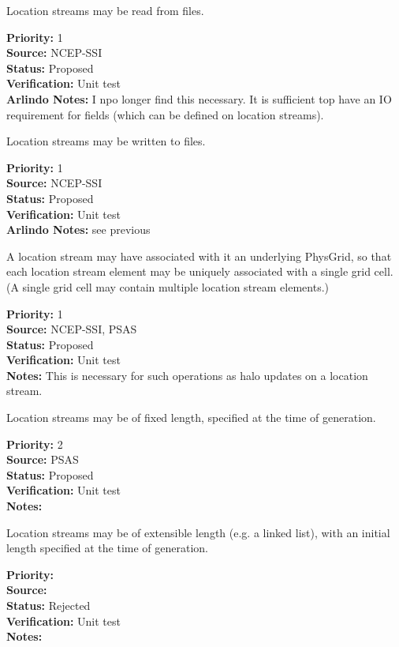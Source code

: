 Location streams may be read from files.
\begin{reqlist}
{\bf Priority:} 1 \\
{\bf Source:} NCEP-SSI \\
{\bf Status:} Proposed \\
{\bf Verification:} Unit test \\
{\bf Arlindo Notes:} I npo longer find this necessary. It is sufficient top have an IO requirement for fields (which can be defined on location streams).
\end{reqlist}

Location streams may be written to files.
\begin{reqlist}
{\bf Priority:} 1 \\
{\bf Source:} NCEP-SSI \\
{\bf Status:} Proposed \\
{\bf Verification:} Unit test \\
{\bf Arlindo Notes:} see previous 
\end{reqlist}

A location stream may have associated with it an underlying PhysGrid, so that each
location stream element may be uniquely associated with a single grid cell. (A single
grid cell may contain multiple location stream elements.)
\begin{reqlist}
{\bf Priority:} 1 \\
{\bf Source:} NCEP-SSI, PSAS \\
{\bf Status:} Proposed \\
{\bf Verification:} Unit test \\
{\bf Notes:} This is necessary for such operations as halo updates on a location
stream.
\end{reqlist}


Location streams may be of fixed length, specified at the time of generation.
\begin{reqlist}
{\bf Priority:} 2 \\
{\bf Source:} PSAS\\
{\bf Status:} Proposed \\
{\bf Verification:} Unit test\\
{\bf Notes:} 
\end{reqlist}

Location streams may be of extensible length (e.g. a linked list),
with an initial length specified at the time of generation.
\begin{reqlist}
{\bf Priority:} \\
{\bf Source:} \\
{\bf Status:} Rejected \\
{\bf Verification:} Unit test\\
{\bf Notes:} 
\end{reqlist}

